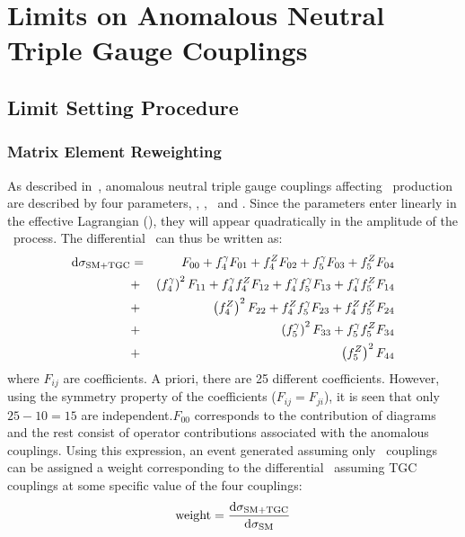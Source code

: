 \graphicspath{{Chapters/TGCLimits/Figures/}}
\chapter{Limits on Anomalous Neutral Triple Gauge Couplings}
\label{chap:TGCLimits}

\section{Limit Setting Procedure}

\subsection{Matrix Element Reweighting}
As described in~, anomalous neutral triple gauge couplings affecting \ZZ\
production are described by four parameters, \ffourg, \ffourZ, \ffiveg\ and
\ffiveZ.
Since the parameters enter linearly in the effective Lagrangian
(), they will appear
quadratically in the amplitude of the \ZZllll\ process. The differential \cx\
can thus be written as:
\begin{eqnarray}\label{eqn:dsigma}
{\rm d}\sigma_{\rm SM+TGC} & = & F_{00} + f_4^\gamma F_{01} + f_4^Z F_{02} + f_5^\gamma F_{03} + f_5^Z F_{04}  \nonumber \\
&+& \left(f_4^\gamma\right)^2F_{11} + f_4^\gamma f_4^Z F_{12} +  f_4^\gamma f_5^\gamma F_{13} + f_4^\gamma f_5^Z F_{14}  \nonumber \\
&+& \left(f_4^Z\right)^2F_{22} + f_4^Zf_5^\gamma F_{23} + f_4^Zf_5^Z F_{24}  \nonumber \\
&+& \left(f_5^\gamma\right)^2F_{33} + f_5^\gamma f_5^Z F_{34} \nonumber \\
&+& \left(f_5^Z\right)^2F_{44}
\end{eqnarray}
where $F_{ij}$ are coefficients. A priori, there are 25 different coefficients. However, using the 
symmetry property of the coefficients ($F_{ij}=F_{ji}$), it is seen 
that only $25-10=15$ are independent.$F_{00}$ corresponds to the contribution of \sm
diagrams and the rest consist of operator contributions associated with the
anomalous couplings. Using this expression, an event generated assuming only
\sm\ couplings can be assigned a weight corresponding to the differential \cx\ assuming TGC couplings
at some specific value of the four couplings:
\begin{equation}
{\rm weight} = \frac{{\rm d}\sigma_{\rm SM+TGC}}{{\rm d}\sigma_{\rm SM}}
\end{equation}
